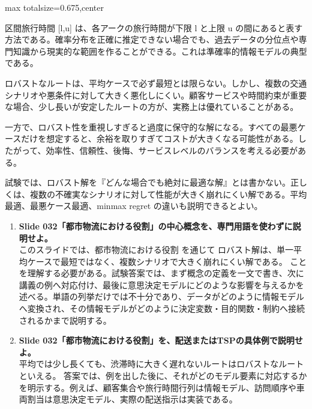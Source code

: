\begin{adjustbox}{max totalsize={\textwidth}{0.675\textheight},center}
\begin{minipage}{\textwidth}
\begin{minipage}[t]{0.485\textwidth}
区間旅行時間 [l,u] は、各アークの旅行時間が下限 l と上限 u の間にあると表す方法である。確率分布を正確に推定できない場合でも、過去データの分位点や専門知識から現実的な範囲を作ることができる。これは準確率的情報モデルの典型である。\par
ロバストなルートは、平均ケースで必ず最短とは限らない。しかし、複数の交通シナリオや悪条件に対して大きく悪化しにくい。顧客サービスや時間約束が重要な場合、少し長いが安定したルートの方が、実務上は優れていることがある。\par
一方で、ロバスト性を重視しすぎると過度に保守的な解になる。すべての最悪ケースだけを想定すると、余裕を取りすぎてコストが大きくなる可能性がある。したがって、効率性、信頼性、後悔、サービスレベルのバランスを考える必要がある。\par
試験では、ロバスト解を『どんな場合でも絶対に最適な解』とは書かない。正しくは、複数の不確実なシナリオに対して性能が大きく崩れにくい解である。平均最適、最悪ケース最適、minmax regret の違いも説明できるとよい。\par
{}
\begin{enumerate}
\item \textbf{Slide 032「都市物流における役割」の中心概念を、専門用語を使わずに説明せよ。}\\このスライドでは、都市物流における役割 を通じて ロバスト解は、単一平均ケースで最短ではなく、複数シナリオで大きく崩れにくい解である。 ことを理解する必要がある。試験答案では、まず概念の定義を一文で書き、次に講義の例へ対応付け、最後に意思決定モデルにどのような影響を与えるかを述べる。単語の列挙だけでは不十分であり、データがどのように情報モデルへ変換され、その情報モデルがどのように決定変数・目的関数・制約へ接続されるかまで説明する。
\item \textbf{Slide 032「都市物流における役割」を、配送またはTSPの具体例で説明せよ。}\\平均では少し長くても、渋滞時に大きく遅れないルートはロバストなルートといえる。 答案では、例を出した後に、それがどのモデル要素に対応するかを明示する。例えば、顧客集合や旅行時間行列は情報モデル、訪問順序や車両割当は意思決定モデル、実際の配送指示は実装である。
\end{enumerate}
\end{minipage}
\end{minipage}
\end{adjustbox}

